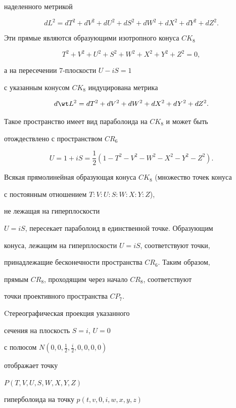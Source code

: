 наделенного метрикой


$$


\label{e176}


dL^2=dT^2+dV^2+dU^2+dS^2+dW^2+dX^2+dY^2+dZ^2.


$$


Эти прямые являются образующими изотропного конуса $CK_8$


$$


\label{e177}


T^2+V^2+U^2+S^2+W^2+X^2+Y^2+Z^2=0,


$$


а на пересечении 7-плоскости $U-iS=1$


с указанным конусом $CK_8$ индуцирована метрика


$$


\label{e1772}


d\wt L^2=dT^2+dV^2+dW^2+dX^2+dY^2+dZ^2.


$$


Такое пространство имеет вид параболоида на $CK_8$ и может быть


отождествлено с пространством $CR_6$


$$


\label{e1773}


U=1+iS=\frac{1}{2}(1-T^2-V^2-W^2-X^2-Y^2-Z^2).


$$


Всякая прямолинейная образующая конуса $CK_8$ (множество точек конуса


с постоянным отношением $T:V:U:S:W:X:Y:Z$),


не лежащая на гиперплоскости


$U=iS$, пересекает параболоид в единственной точке. Образующим


конуса, лежащим на гиперплоскости $U=iS$, соответствуют точки,


принадлежащие бесконечности пространства $CR_6$. Таким образом,


прямым $CR_8$, проходящим через начало $CR_8$, соответствуют


точки проективного пространства $CP_7$.


Cтереографическая проекция указанного


сечения на плоскость $S=i$, $U=0$


с полюсом $N(0,0,\frac{1}{2},\frac{i}{2},0,0,0,0)$


отображает точку


$P(T,V,U,S,W,X,Y,Z)$


гиперболоида на точку $p(t,v,0,i,w,x,y,z)$


